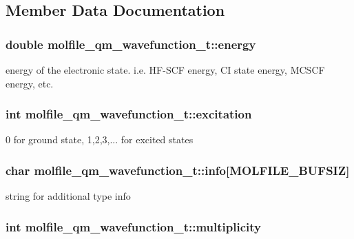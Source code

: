 \subsection{\-Member \-Data \-Documentation}
\hypertarget{structmolfile__qm__wavefunction__t_af575f54ea43a5504b153adee3feb4ecd}{
\subsubsection[{energy}]{\setlength{\rightskip}{0pt plus 5cm}double {\bf molfile\-\_\-qm\-\_\-wavefunction\-\_\-t\-::energy}}}\label{structmolfile__qm__wavefunction__t_af575f54ea43a5504b153adee3feb4ecd}
energy of the electronic state. i.\-e. \-H\-F-\/\-S\-C\-F energy, \-C\-I state energy, \-M\-C\-S\-C\-F energy, etc. \hypertarget{structmolfile__qm__wavefunction__t_a46ff8816f806362106f9e550e385e289}{
\subsubsection[{excitation}]{\setlength{\rightskip}{0pt plus 5cm}int {\bf molfile\-\_\-qm\-\_\-wavefunction\-\_\-t\-::excitation}}}\label{structmolfile__qm__wavefunction__t_a46ff8816f806362106f9e550e385e289}
0 for ground state, 1,2,3,... for excited states \hypertarget{structmolfile__qm__wavefunction__t_a5eda58c499658671a6f296e30807b788}{
\subsubsection[{info}]{\setlength{\rightskip}{0pt plus 5cm}char {\bf molfile\-\_\-qm\-\_\-wavefunction\-\_\-t\-::info}\mbox{[}{\bf \-M\-O\-L\-F\-I\-L\-E\-\_\-\-B\-U\-F\-S\-I\-Z}\mbox{]}}}\label{structmolfile__qm__wavefunction__t_a5eda58c499658671a6f296e30807b788}
string for additional type info \hypertarget{structmolfile__qm__wavefunction__t_ab6f62ad30968e3da16edd859c5523119}{
\subsubsection[{multiplicity}]{\setlength{\rightskip}{0pt plus 5cm}int {\bf molfile\-\_\-qm\-\_\-wavefunction\-\_\-t\-::multiplicity}}}\label{structmolfile__qm__wavefunction__t_ab6f62ad30968e3da16edd859c5523119}
